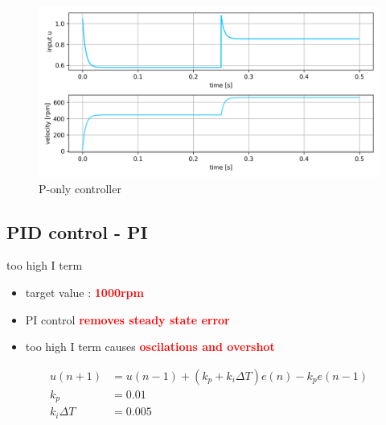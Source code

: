 \documentclass[12pt,twoside,onecolumn,openany,extrafontsizes,dvipsnames]{memoir}
\begin{document}
                \begin{figure}[!htb]
                    \centering
                    \includegraphics[scale=0.8]{../images/motor_control/pid_p_control.png}
                    \caption{P-only controller}
                    \label{fig:p_controller}
                \end{figure}

            \newpage
            \subsection{PID control - PI}
                
                too high I term 

                \begin{itemize}
                    \item  target value : \textcolor{red}{\textbf {1000rpm}}
                    \item  PI control \textcolor{red}{\textbf {removes steady state error}}
                    \item  too high I term causes \textcolor{red}{\textbf {oscilations and overshot}}
                \end{itemize}
            
              
                \begin{align}
                    u(n+1) &= u(n-1) + (k_p + k_i\Delta T) e(n) - k_pe(n-1) \\
                    k_p    &= 0.01 \\
                    k_i\Delta T    &= 0.005
                \end{align}
                
\end{document}
